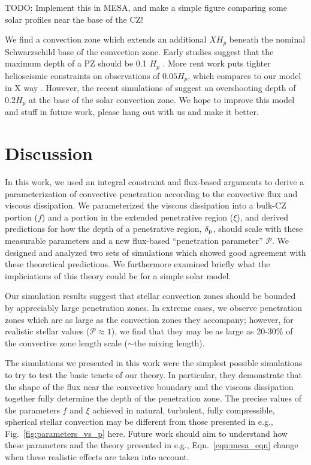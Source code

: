 \documentclass[twocolumn]{aastex631}
\newcommand{\delp}{\ensuremath{\delta_{\rm{p}}}}
\newcommand{\mP}{\ensuremath{\mathcal{P}}}
\begin{document}
TODO: Implement this in MESA, and make a simple figure comparing some solar profiles near the base of the CZ!

We find a convection zone which extends an additional $X H_p$ beneath the nominal Schwarzschild base of the convection zone.
Early studies suggest that the maximum depth of a PZ should be 0.1 $H_p$ \citep{basu_etal_1994}.
More rent work puts tighter helioseismic constraints on observations of $0.05 H_p$, which compares to our model in X way \citep[see e.g., section 7.2.1 of][]{basu2016}.
However, the recent simulations of \citet{kapyla2019} suggest an overshooting depth of $0.2 H_p$ at the base of the solar convection zone.
We hope to improve this model and stuff in future work, please hang out with us and make it better.


\section{Discussion}
\label{sec:discussion}
In this work, we used an integral constraint \citep[reminiscent of][]{roxburgh1989} and flux-based arguments \citep[similar to][]{zahn1991} to derive a parameterization of convective penetration according to the convective flux and viscous dissipation.
We parameterized the viscous dissipation into a bulk-CZ portion ($f$) and a portion in the extended penetrative region ($\xi$), and derived predictions for how the depth of a penetrative region, $\delp$, should scale with these measurable parameters and a new flux-based ``penetration parameter'' $\mP$.
We designed and analyzed two sets of simulations which showed good agreement with these theoretical predictions.
We furthermore examined briefly what the impliciations of this theory could be for a simple solar model.

Our simulation results suggest that stellar convection zones should be bounded by appreciably large penetration zones.
In extreme cases, we observe penetration zones which are as large as the convection zones they accompany; however, for realistic stellar values ($\mP \approx 1$), we find that they may be as large as 20-30\% of the convective zone length scale ($\sim$the mixing length).

The simulations we presented in this work were the simplest possible simulations to try to test the basic tenets of our theory.
In particular, they demonstrate that the shape of the flux near the convective boundary and the viscous dissipation together fully determine the depth of the penetration zone.
The precise values of the parameters $f$ and $\xi$ achieved in natural, turbulent, fully compressible, spherical stellar convection may be different from those presented in e.g., Fig.~\ref{fig:parameters_vs_p} here.
Future work should aim to understand how these parameters and the theory presented in e.g., Eqn.~\ref{eqn:mesa_eqn} change when these realistic effects are taken into account.
\end{document}
